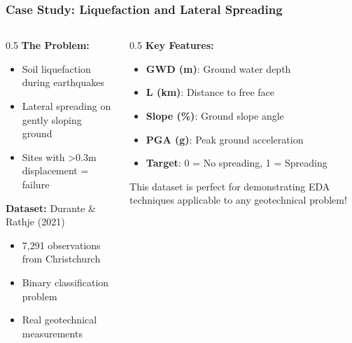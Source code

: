 \documentclass[aspectratio=169]{beamer}
\begin{document}
\begin{frame}
\frametitle{Case Study: Liquefaction and Lateral Spreading}

\begin{columns}[T]
    \begin{column}{0.5\textwidth}
        \textbf{The Problem:}
        \begin{itemize}
            \item Soil liquefaction during earthquakes
            \item Lateral spreading on gently sloping ground
            \item Sites with >0.3m displacement = failure
        \end{itemize}

        \vspace{0.3cm}

        \textbf{Dataset:} Durante \& Rathje (2021)
        \begin{itemize}
            \item 7,291 observations from Christchurch
            \item Binary classification problem
            \item Real geotechnical measurements
        \end{itemize}
    \end{column}
    \begin{column}{0.5\textwidth}
        \textbf{Key Features:}
        \begin{itemize}
            \item \textbf{GWD (m)}: Ground water depth
            \item \textbf{L (km)}: Distance to free face
            \item \textbf{Slope (\%)}: Ground slope angle
            \item \textbf{PGA (g)}: Peak ground acceleration
            \item \textbf{Target}: 0 = No spreading, 1 = Spreading
        \end{itemize}

        \vspace{0.3cm}

        This dataset is perfect for demonstrating EDA techniques applicable to any geotechnical problem!
    \end{column}
\end{columns}

\end{frame}
\end{document}
